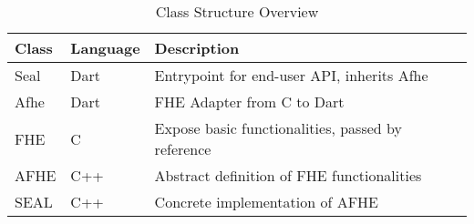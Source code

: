 \begin{table}[h!]
\centering
\begin{tabular}{|l|l|p{8cm}|}
\hline
\textbf{Class} & \textbf{Language} & \textbf{Description} \\ \hline
Seal & Dart & Entrypoint for end-user API, inherits Afhe \\ \hline
Afhe & Dart & FHE Adapter from C to Dart \\ \hline
FHE & C & Expose basic functionalities, passed by reference \\ \hline
AFHE & C++ & Abstract definition of FHE functionalities \\ \hline
SEAL & C++ & Concrete implementation of AFHE \\ \hline
\end{tabular}
\caption{Class Structure Overview}
\label{table:class-structure}
\end{table}
